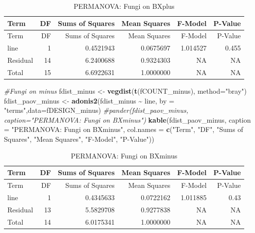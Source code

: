 \documentclass[
  11pt,
]{article}
\newenvironment{Shaded}{\begin{snugshade}}{\end{snugshade}}
\newcommand{\AttributeTok}[1]{\textcolor[rgb]{0.13,0.29,0.53}{#1}}
\newcommand{\CommentTok}[1]{\textcolor[rgb]{0.56,0.35,0.01}{\textit{#1}}}
\newcommand{\FunctionTok}[1]{\textcolor[rgb]{0.13,0.29,0.53}{\textbf{#1}}}
\newcommand{\NormalTok}[1]{#1}
\newcommand{\OtherTok}[1]{\textcolor[rgb]{0.56,0.35,0.01}{#1}}
\newcommand{\SpecialCharTok}[1]{\textcolor[rgb]{0.81,0.36,0.00}{\textbf{#1}}}
\newcommand{\StringTok}[1]{\textcolor[rgb]{0.31,0.60,0.02}{#1}}
\begin{document}
\begin{longtable}[]{@{}lrrrrr@{}}
\caption{PERMANOVA: Fungi on BXplus}\tabularnewline
\toprule\noalign{}
Term & DF & Sums of Squares & Mean Squares & F-Model & P-Value \\
\midrule\noalign{}
\endfirsthead
\toprule\noalign{}
Term & DF & Sums of Squares & Mean Squares & F-Model & P-Value \\
\midrule\noalign{}
\endhead
\bottomrule\noalign{}
\endlastfoot
line & 1 & 0.4521943 & 0.0675697 & 1.014527 & 0.455 \\
Residual & 14 & 6.2400688 & 0.9324303 & NA & NA \\
Total & 15 & 6.6922631 & 1.0000000 & NA & NA \\
\end{longtable}

\begin{Shaded}
\begin{Highlighting}[]
\CommentTok{\#Fungi on minus}
\NormalTok{fdist\_minus }\OtherTok{\textless{}{-}} \FunctionTok{vegdist}\NormalTok{(}\FunctionTok{t}\NormalTok{(fCOUNT\_minus), }\AttributeTok{method=}\StringTok{"bray"}\NormalTok{)}
\NormalTok{fdist\_paov\_minus }\OtherTok{\textless{}{-}} \FunctionTok{adonis2}\NormalTok{(fdist\_minus }\SpecialCharTok{\textasciitilde{}}\NormalTok{ line, }\AttributeTok{by =} \StringTok{"terms"}\NormalTok{,}\AttributeTok{data=}\NormalTok{fDESIGN\_minus)}
\CommentTok{\#pander(fdist\_paov\_minus, caption="PERMANOVA: Fungi on BXminus")}
\FunctionTok{kable}\NormalTok{(fdist\_paov\_minus, }\AttributeTok{caption =} \StringTok{"PERMANOVA: Fungi on BXminus"}\NormalTok{,}
      \AttributeTok{col.names =} \FunctionTok{c}\NormalTok{(}\StringTok{"Term"}\NormalTok{, }\StringTok{"DF"}\NormalTok{, }\StringTok{"Sums of Squares"}\NormalTok{, }\StringTok{"Mean Squares"}\NormalTok{, }\StringTok{"F{-}Model"}\NormalTok{, }\StringTok{"P{-}Value"}\NormalTok{))}
\end{Highlighting}
\end{Shaded}

\begin{longtable}[]{@{}lrrrrr@{}}
\caption{PERMANOVA: Fungi on BXminus}\tabularnewline
\toprule\noalign{}
Term & DF & Sums of Squares & Mean Squares & F-Model & P-Value \\
\midrule\noalign{}
\endfirsthead
\toprule\noalign{}
Term & DF & Sums of Squares & Mean Squares & F-Model & P-Value \\
\midrule\noalign{}
\endhead
\bottomrule\noalign{}
\endlastfoot
line & 1 & 0.4345633 & 0.0722162 & 1.011885 & 0.43 \\
Residual & 13 & 5.5829708 & 0.9277838 & NA & NA \\
Total & 14 & 6.0175341 & 1.0000000 & NA & NA \\
\end{longtable}
\end{document}
